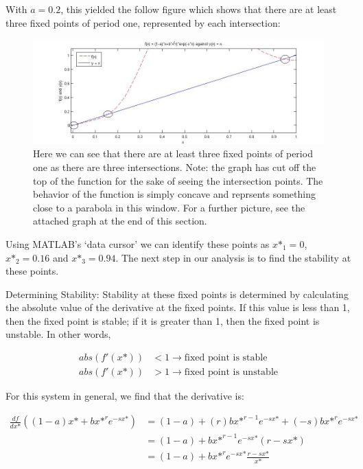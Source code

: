 With $a=0.2$, this yielded the follow figure which shows that there are at least three fixed points of period one, represented by each intersection: 


\begin{figure}[H]
    \begin{center}
    \includegraphics[width=\textwidth]{P1_Q2}
    \end{center}
    \caption{Here we can see that there are at least three fixed points of period one as there are three intersections. Note: the graph has cut off the top of the function for the sake of seeing the intersection points. The behavior of the function is simply concave and reprsents something close to a parabola in this window. For a further picture, see the attached graph at the end of this section.}
    \label{figure:2.1}
\end{figure}

Using MATLAB's `data cursor' we can identify these points as $x\text{*}_{1} = 0$, $x\text{*}_{2} = 0.16$ and $x\text{*}_{3} = 0.94$. The next step in our analysis is to find the stability at these points.

Determining Stability: Stability at these fixed points is determined by calculating the absolute value of the derivative at the fixed points. If this value is less than 1, then the fixed point is stable; if it is greater than 1, then the fixed point is unstable. In other words,

\begin{align*}
abs(f'(x\text{*})) &< 1 \rightarrow \text{fixed point is stable} \\
abs(f'(x\text{*})) &> 1 \rightarrow \text{fixed point is unstable}
\end{align*}

For this system in general, we find that the derivative is:

\begin{align*}
	\frac{df}{dx\text{*}}((1-a)x\text{*} + bx\text{*}^{r}e^{-sx\text{*}}) &= (1-a) + (r)bx\text{*}^{r-1}e^{-sx\text{*}} + (-s)bx\text{*}^{r}e^{-sx\text{*}} \\
	&= (1-a) + bx\text{*}^{r-1}e^{-sx\text{*}}(r-sx\text{*}) \\	
	&= (1-a) + bx\text{*}^{r}e^{-sx\text{*}}\frac{r-sx\text{*}}{x\text{*}}\\
\end{align*}

